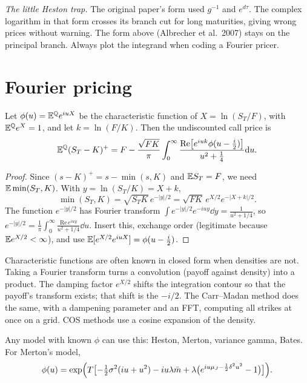 \begin{pitfall}
\emph{The little Heston trap.} The original paper's form used $g^{-1}$ and $e^{d\tau}$. The complex logarithm in that form crosses its branch cut for long maturities, giving wrong prices without warning. The form above (Albrecher et al.\ 2007) stays on the principal branch. Always plot the integrand when coding a Fourier pricer.
\end{pitfall}

\section{Fourier pricing}\label{sec:fourier}

\begin{theorem}\label{thm:lewis}
Let $\phi(u)=\mathbb{E}^{\mathbb{Q}} e^{iuX}$ be the characteristic function of $X=\ln(S_T/F)$, with $\mathbb{E}^{\mathbb{Q}} e^X=1$, and let $k=\ln(F/K)$. Then the undiscounted call price is
\[
\mathbb{E}^{\mathbb{Q}}(S_T-K)^+=F-\frac{\sqrt{FK}}{\pi}\int_0^\infty\frac{\mathrm{Re}\bigl[e^{iuk}\phi(u-\tfrac i2)\bigr]}{u^2+\frac14}\mathrm{d} u.
\]
\end{theorem}
\begin{proof}
Since $(s-K)^+=s-\min(s,K)$ and $\mathbb{E} S_T=F$, we need $\mathbb{E}\min(S_T,K)$. With $y=\ln(S_T/K)=X+k$,
\[
\min(S_T,K)=\sqrt{S_TK}\,e^{-|y|/2}=\sqrt{FK}\,e^{X/2}e^{-|X+k|/2}.
\]
The function $e^{-|y|/2}$ has Fourier transform $\int e^{-|y|/2}e^{-iuy}\dd y=\frac{1}{u^2+1/4}$, so $e^{-|y|/2}=\frac1\pi\int_0^\infty\frac{\mathrm{Re}\,e^{iuy}}{u^2+1/4}\dd u$. Insert this, exchange order (legitimate because $\mathbb{E} e^{X/2}<\infty$), and use $\mathbb{E}[e^{X/2}e^{iuX}]=\phi(u-\tfrac i2)$.
\end{proof}

\begin{intuition}
Characteristic functions are often known in closed form when densities are not. Taking a Fourier transform turns a convolution (payoff against density) into a product. The damping factor $e^{X/2}$ shifts the integration contour so that the payoff's transform exists; that shift is the $-i/2$. The Carr--Madan method does the same, with a dampening parameter and an FFT, computing all strikes at once on a grid. COS methods use a cosine expansion of the density.
\end{intuition}

Any model with known $\phi$ can use this: Heston, Merton, variance gamma, Bates. For Merton's model,
\[
\phi(u)=\exp\Bigl(T\bigl[-\tfrac12\sigma^2(iu+u^2)-iu\lambda\bar m+\lambda\bigl(e^{iu\mu_J-\frac12\delta^2u^2}-1\bigr)\bigr]\Bigr).
\]

